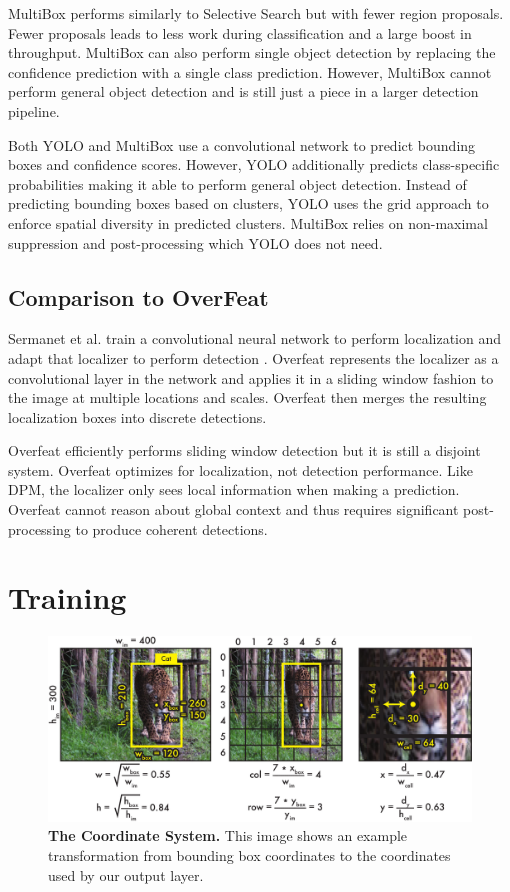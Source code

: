 \documentclass{article} %
\begin{document}
MultiBox performs similarly to Selective Search but with fewer region proposals. Fewer proposals leads to less work during classification and a large boost in throughput. MultiBox can also perform single object detection by replacing the confidence prediction with a single class prediction. However, MultiBox cannot perform general object detection and is still just a piece in a larger detection pipeline.

Both YOLO and MultiBox use a convolutional network to predict bounding boxes and confidence scores. However, YOLO additionally predicts class-specific probabilities making it able to perform general object detection. Instead of predicting bounding boxes based on clusters, YOLO uses the grid approach to enforce spatial diversity in predicted clusters. MultiBox relies on non-maximal suppression and post-processing which YOLO does not need.

\subsection{Comparison to OverFeat}

Sermanet et al. train a convolutional neural network to perform localization and adapt that localizer to perform detection \cite{DBLP:journals/corr/SermanetEZMFL13}. Overfeat represents the localizer as a convolutional layer in the network and applies it in a sliding window fashion to the image at multiple locations and scales. Overfeat then merges the resulting localization boxes into discrete detections.

Overfeat efficiently performs sliding window detection but it is still a disjoint system. Overfeat optimizes for localization, not detection performance. Like DPM, the localizer only sees local information when making a prediction. Overfeat cannot reason about global context and thus requires significant post-processing to produce coherent detections.

\section{Training}

   \begin{figure}[t]
      \centering
        \includegraphics[width=.8\linewidth]{transform}
      \caption{\textbf{The Coordinate System.} This image shows an example transformation from bounding box coordinates to the coordinates used by our output layer.}
      \label{transform}
   \end{figure}
\end{document}
